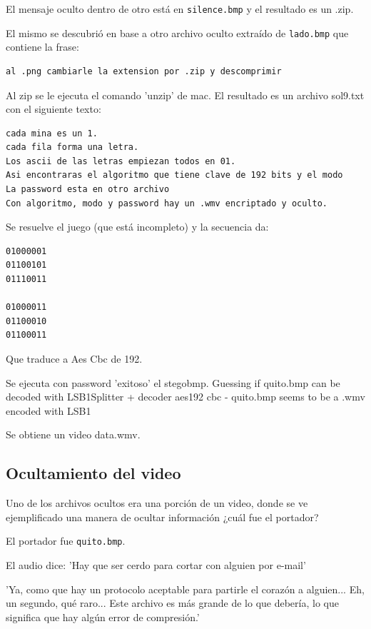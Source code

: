 El mensaje oculto dentro de otro está en \texttt{silence.bmp} y el resultado es un .zip.

El mismo se descubrió en base a otro archivo oculto extraído de \texttt{lado.bmp} que contiene la frase:
\begin{lstlisting}
al .png cambiarle la extension por .zip y descomprimir
\end{lstlisting}

Al zip se le ejecuta el comando 'unzip' de mac. El resultado es un archivo sol9.txt con el siguiente texto:

\begin{lstlisting}
cada mina es un 1.
cada fila forma una letra.
Los ascii de las letras empiezan todos en 01.
Asi encontraras el algoritmo que tiene clave de 192 bits y el modo
La password esta en otro archivo
Con algoritmo, modo y password hay un .wmv encriptado y oculto.
\end{lstlisting}

Se resuelve el juego (que est\'a incompleto) y la secuencia da:

\begin{lstlisting}
01000001
01100101
01110011

01000011
01100010
01100011
\end{lstlisting}

Que traduce a Aes Cbc de 192.

Se ejecuta con password 'exitoso' el stegobmp.
Guessing if quito.bmp can be decoded with LSB1Splitter + decoder aes192 cbc
- quito.bmp seems to be a .wmv encoded with LSB1

Se obtiene un video data.wmv.

\subsection{Ocultamiento del video}
\begin{displayquote}
Uno de los archivos ocultos era una porción de un video, donde se ve ejemplificado una manera
de ocultar información ¿cuál fue el portador?
\end{displayquote}

El portador fue \texttt{quito.bmp}.

El audio dice:
'Hay que ser cerdo para cortar con alguien por e-mail'

'Ya, como que hay un protocolo aceptable para partirle el coraz\'on a alguien... Eh, un segundo, qu\'e raro... Este archivo es m\'as grande de lo que deber\'ia, lo que significa que hay alg\'un error de compresi\'on.'


